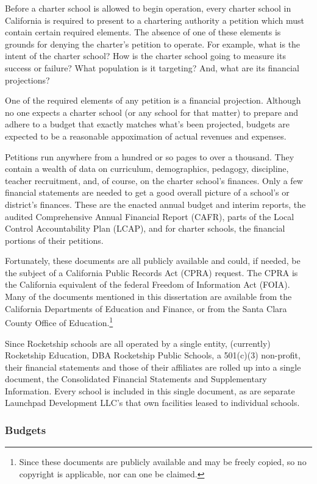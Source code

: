 Before a charter school is allowed to begin operation, every charter school in California is required to present to a chartering authority a petition which must contain certain required elements. The absence of one of these elements is grounds for denying the charter's petition to operate. For example, what is the intent of the charter school? How is the charter school going to measure its success or failure? What population is it targeting? And, what are its financial projections?

One of the required elements of any petition is a financial projection. Although no one expects a charter school (or any school for that matter) to prepare and adhere to a budget that exactly matches what's been projected, budgets are expected to be a reasonable appoximation of actual revenues and expenses.

Petitions run anywhere from a hundred or so pages to over a thousand. They contain a wealth of data on curriculum, demographics, pedagogy, discipline, teacher recruitment, and, of course, on the charter school's finances. Only a few financial statements are needed to get a good overall picture of a school's or district's finances. These are the enacted annual budget and interim reports, the audited Comprehensive Annual Financial Report (CAFR), parts of the Local Control Accountability Plan (LCAP), and for charter schools, the financial portions of their petitions.

Fortunately, these documents are all publicly available and could, if needed, be the subject of a California Public Records Act (CPRA) request. The CPRA is the California equivalent of the federal Freedom of Information Act (FOIA). Many of the documents mentioned in this dissertation are available from the California Departments of Education and Finance, or from the Santa Clara County Office of Education.\footnote{Since these documents are publicly available and may be freely copied, so no copyright is applicable, nor can one be claimed.}

Since Rocketship schools are all operated by a single entity, (currently) Rocketship Education, DBA Rocketship Public Schools, a 501(c)(3) non-profit, their financial statements and those of their affiliates are rolled up into a single document, the Consolidated Financial Statements and Supplementary Information. Every school is included in this single document, as are separate Launchpad Development LLC's that own facilities leased to individual schools. %

\subsubsection{Budgets}\label{sec:budgets}\indent

